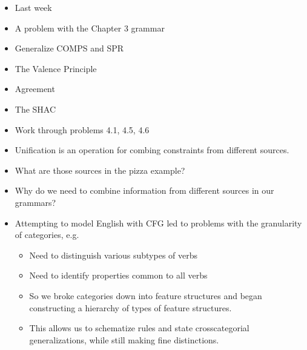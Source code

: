 \documentclass[a4paper,landscape,headrule,footrule]{foils}
\begin{document}
\maketitle


\begin{itemize}
\item Last week
\item A problem with the Chapter 3 grammar
\item Generalize COMPS and SPR
\item The Valence Principle
\item Agreement
\item The SHAC
\item Work through problems 4.1, 4.5, 4.6
\end{itemize}

\MyLogo{}
\begin{itemize}
\item Unification is an operation for combing
constraints from different sources.

\item What are those sources in the pizza
example?

\item Why do we need to combine information
from different sources in our grammars?
\end{itemize}

\begin{itemize}
\item Attempting to model English with CFG led to problems
  with the granularity of categories, e.g.
  \begin{itemize}
  \item Need to distinguish various subtypes of verbs
  \item Need to identify properties common to all verbs
  \end{itemize}
\begin{itemize}
\item So we broke categories down into feature structures and
  began constructing a hierarchy of types of feature
  structures.
\item This allows us to schematize rules and state crosscategorial
  generalizations, while still making fine distinctions.
\end{itemize}
\end{itemize}
\end{document}

